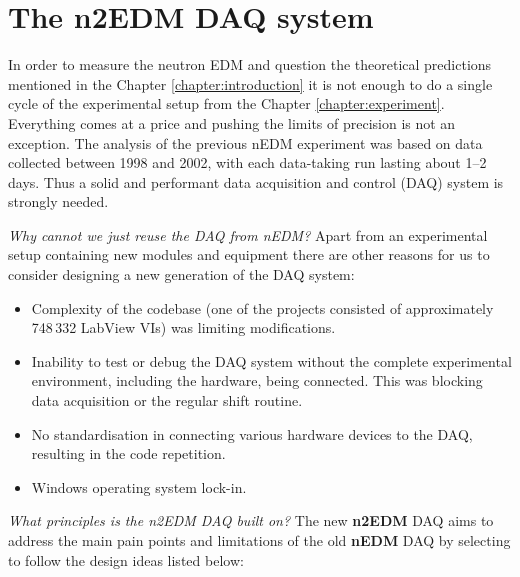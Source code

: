 \chapter{The n2EDM DAQ system}
\label{chapter:daq}

In order to measure the neutron EDM and question the theoretical predictions mentioned in the Chapter \ref{chapter:introduction} it is not enough to do a single cycle of the experimental setup from the Chapter \ref{chapter:experiment}. Everything comes at a price and pushing the limits of precision is not an exception. The analysis \cite{Pendlebury2004} of the previous nEDM experiment was based on data collected between 1998 and 2002, with each data-taking run lasting about 1--2 days. Thus a solid and performant data acquisition and control (DAQ) system is strongly needed.

\textit{Why cannot we just reuse the DAQ from nEDM?} Apart from an experimental setup containing new modules and equipment there are \cite{Bison2018} other reasons for us to consider designing a new generation of the DAQ system:

\begin{itemize}
	\item Complexity of the codebase (one of the projects consisted of approximately 748\,332 LabView VIs) was limiting modifications.
	\item Inability to test or debug the DAQ system without the complete experimental environment, including the hardware, being connected. This was blocking data acquisition or the regular shift routine.
	\item No standardisation in connecting various hardware devices to the DAQ, resulting in the code repetition.
	\item Windows operating system lock-in.
\end{itemize}

\textit{What principles is the n2EDM DAQ built on?} The new \textbf{n2EDM} DAQ aims to address the main pain points and limitations of the old \textbf{nEDM} DAQ by selecting to follow the design ideas listed below:

